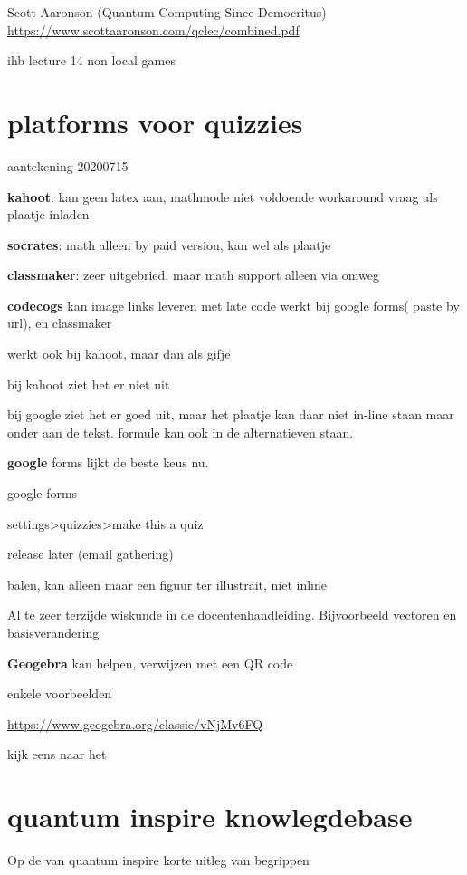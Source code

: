 \documentclass[../../main.tex]{subfiles}
\begin{document}
Scott Aaronson (Quantum Computing Since Democritus)
\url{https://www.scottaaronson.com/qclec/combined.pdf}

ihb lecture 14 non local games
\clearpage

\section{platforms voor quizzies}
aantekening 20200715

\textbf{kahoot}: kan geen latex aan, mathmode niet voldoende workaround vraag als plaatje inladen

\textbf{socrates}: math alleen by paid version, kan wel als plaatje


\textbf{classmaker}: zeer uitgebried, maar math support alleen via omweg

\textbf{codecogs} kan image links leveren met late code
werkt bij google forms( paste by url), en classmaker

werkt ook bij kahoot, maar dan als gifje

bij kahoot ziet het er niet uit

bij google ziet het er goed uit, maar het plaatje kan daar niet in-line staan maar onder aan de tekst. formule kan ook in de alternatieven staan.


\textbf{google} forms lijkt de beste keus nu.


google forms

settings>quizzies>make this a quiz

release later (email gathering)

balen, kan alleen maar een figuur ter illustrait, niet inline






Al te zeer terzijde wiskunde in de docentenhandleiding. Bijvoorbeeld vectoren en basisverandering

\textbf{Geogebra} kan helpen, verwijzen met een QR code

enkele voorbeelden

\url{https://www.geogebra.org/classic/vNjMv6FQ}

kijk eens naar het 

\section{quantum inspire knowlegdebase}

Op de  van quantum inspire korte uitleg van begrippen
\end{document}
